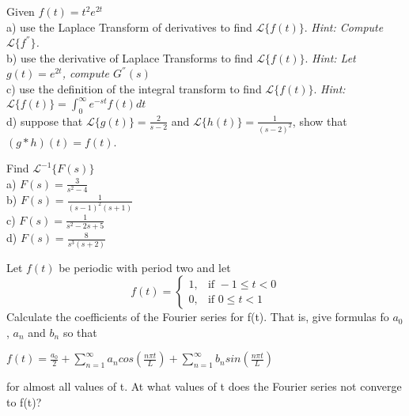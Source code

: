 \documentclass[12pt,letterpaper, onecolumn]{exam}
\begin{document}
\begin{questions}
    \question[4 Marks] Given $f(t) = t^2 e^{2t}$ \\
             a) use the Laplace Transform of derivatives to find $\mathcal{L} \{f(t)\}$. \textit{Hint: Compute $\mathcal{L} \{f^{''}\}$.}\\
             b) use the derivative of Laplace Transforms to find $\mathcal{L}\{f(t)\}$. \textit{Hint: Let $g(t) = e^{2t}$, compute $G^{''}(s)$}\\
             c) use the definition of the integral transform to find $\mathcal{L}\{f(t)\}$. \textit{Hint: $\mathcal{L}\{f(t)\} = \int_{0}^{\infty} e^{-st} f(t) dt$}\\
             d) suppose that $\mathcal{L}\{g(t)\} = \frac{2}{s - 2}$ and $\mathcal{L}\{h(t)\} = \frac{1}{(s-2)^2}$, show that $(g \ast h)(t) = f(t)$.
    \droppoints
    
    \question[4 Marks] Find $\mathcal{L}^{-1}\{F(s)\}$\\
             a) $F(s) = \frac{3}{s^2 - 4}$\\
             b) $F(s) = \frac{1}{(s-1)^2 (s+1)}$\\
             c) $F(s) = \frac{1}{s^2 - 2s + 5}$\\
             d) $F(s) = \frac{8}{s^3 (s+2)}$
    \droppoints
    
    \question[3 Marks] Let $f(t)$ be periodic with period two and let\\
             \begin{equation}
             f(t) = 
                 \begin{cases}
                   1, & \text{if } -1 \leq t < 0\\
                   0, & \text{if } 0 \leq t < 1
                 \end{cases}
             \end{equation}
             Calculate the coefficients of the Fourier series for f(t). That is, give formulas fo $a_0$, $a_n$ and $b_n$ so that \\
             \begin{center}$f(t) = \frac{a_0}{2} + \sum_{n=1}^{\infty} a_n cos(\frac{n \pi t}{L}) + \sum_{n=1}^{\infty} b_n sin(\frac{n \pi t}{L})$ \end{center}
             for almost all values of t. At what values of t does the Fourier series not converge to f(t)?
    \droppoints


\end{questions}
\end{document}

